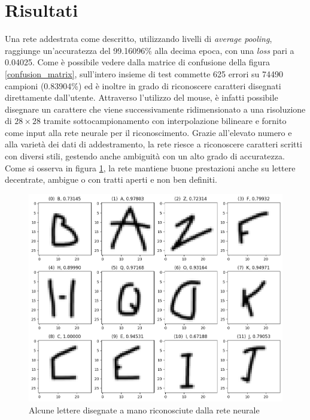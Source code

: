 \documentclass[a4paper,12pt]{article}
\begin{document}
\newpage

\section{Risultati}

Una rete addestrata come descritto, utilizzando livelli di \textit{average pooling}, raggiunge un'accuratezza del 99.16096\% alla decima epoca, con una \textit{loss} pari a 0.04025. 
Come è possibile vedere dalla matrice di confusione della figura \ref{confusion_matrix}, sull'intero insieme di test commette 625 errori su 74490 campioni (0.83904\%) ed è inoltre in grado di riconoscere caratteri disegnati direttamente dall'utente. Attraverso l'utilizzo del mouse, è infatti possibile disegnare un carattere che viene successivamente ridimensionato a una risoluzione di $28 \times 28$ tramite sottocampionamento con interpolazione bilineare e fornito come input alla rete neurale per il riconoscimento.
Grazie all'elevato numero e alla varietà dei dati di addestramento, la rete riesce a riconoscere caratteri scritti con diversi stili, gestendo anche ambiguità con un alto grado di accuratezza.  
Come si osserva in figura \ref{drawn_letters_predicted}, la rete mantiene buone prestazioni anche su lettere decentrate, ambigue o con tratti aperti e non ben definiti.

\begin{figure}[H]
\centering
\includegraphics[width=.8\linewidth]{images/drawn_letters_predicted.png}
\caption{Alcune lettere disegnate a mano riconosciute dalla rete neurale}
\label{drawn_letters_predicted}
\end{figure}
\end{document}
